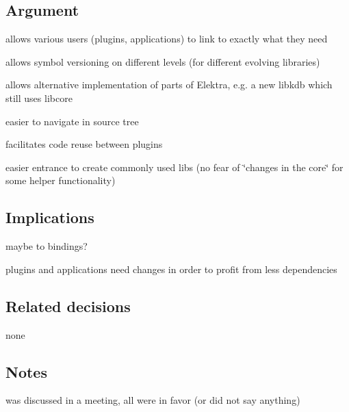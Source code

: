 \subsection*{Argument}


\begin{DoxyItemize}
\item allows various users (plugins, applications) to link to exactly what they need
\item allows symbol versioning on different levels (for different evolving libraries)
\item allows alternative implementation of parts of Elektra, e.\+g. a new libkdb which still uses libcore
\item easier to navigate in source tree
\item facilitates code reuse between plugins
\item easier entrance to create commonly used libs (no fear of \char`\"{}changes in the core\char`\"{} for some helper functionality)
\end{DoxyItemize}

\subsection*{Implications}


\begin{DoxyItemize}
\item maybe to bindings?
\item plugins and applications need changes in order to profit from less dependencies
\end{DoxyItemize}

\subsection*{Related decisions}


\begin{DoxyItemize}
\item none
\end{DoxyItemize}

\subsection*{Notes}


\begin{DoxyItemize}
\item was discussed in a meeting, all were in favor (or did not say anything)
\end{DoxyItemize}

